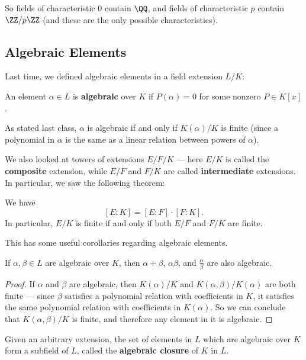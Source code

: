 So fields of characteristic $0$ contain $\QQ$, and fields of characteristic $p$ contain $\ZZ/p\ZZ$ (and these are the only possible characteristics). 

\subsection{Algebraic Elements}

Last time, we defined algebraic elements in a field extension $L/K$: 

\begin{definition}
An element $\alpha \in L$ is \textbf{algebraic} over $K$ if $P(\alpha) = 0$ for some nonzero $P \in K[x]$. 
\end{definition}

As stated last class, $\alpha$ is algebraic if and only if $K(\alpha)/K$ is finite (since a polynomial in $\alpha$ is the same as a linear relation between powers of $\alpha$). 

We also looked at towers of extensions $E/F/K$ --- here $E/K$ is called the \textbf{composite} extension, while $E/F$ and $F/K$ are called \textbf{intermediate} extensions. In particular, we saw the following theorem:

\begin{theorem} \label{tower2}
We have \[[E : K] = [E : F]\cdot [F : K].\] In particular, $E/K$ is finite if and only if both $E/F$ and $F/K$ are finite.
\end{theorem}

This has some useful corollaries regarding algebraic elements. 

\begin{corollary} \label{algebraic}
    If $\alpha, \beta \in L$ are algebraic over $K$, then $\alpha + \beta$, $\alpha\beta$, and $\frac{\alpha}{\beta}$ are also algebraic. 
\end{corollary}

\begin{proof}
    If $\alpha$ and $\beta$ are algebraic, then $K(\alpha)/K$ and $K(\alpha, \beta)/K(\alpha)$ are both finite --- since $\beta$ satisfies a polynomial relation with coefficients in $K$, it satisfies the same polynomial relation with coefficients in $K(\alpha)$. So we can conclude that $K(\alpha, \beta)/K$ is finite, and therefore any element in it is algebraic. 
\end{proof}

\begin{corollary}
    Given an arbitrary extension, the set of elements in $L$ which are algebraic over $K$ form a subfield of $L$, called the \textbf{algebraic closure} of $K$ in $L$. 
\end{corollary}

